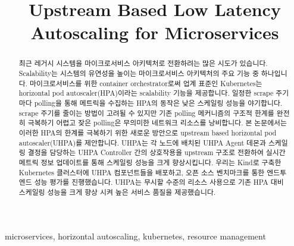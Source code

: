 \documentclass[conference]{IEEEtran}
\begin{document}
\title{Upstream Based Low Latency Autoscaling for Microservices\\}

\author{
}

\maketitle



\begin{abstract}
    최근 레거시 시스템을 마이크로서비스 아키텍처로 전환하려는 많은 시도가 있습니다. Scalability는 시스템의 유연성을 높이는 마이크로서비스 아키텍처의 주요 기능 중 하나입니다. 마이크로서비스를 위한 container orchestrator로써 업계 표준인 Kubernetes는 horizontal pod autoscaler(HPA)이라는 scalability 기능을 제공합니다. 일정한 scrape 주기마다 polling을 통해 메트릭을 수집하는 HPA의 동작은 낮은 스케일링 성능을 야기합니다. scrape 주기를 줄이는 방법이 고려될 수 있지만 기존 polling 메커니즘의 구조적 한계를 완전히 극복하기 어렵고 잦은 polling은 무의미한 네트워크 리소스를 낭비합니다. 본 논문에서는 이러한 HPA의 한계를 극복하기 위한 새로운 방안으로 upstream based horizontal pod autoscaler(UHPA)를 제안합니다. UHPA는 각 노드에 배치된 UHPA Agent 데몬과 스케일링 결정을 담당하는 UHPA Controller 간의 상호작용을 upstream 구조로 전환하여 실시간 메트릭 정보 업데이트를 통해 스케일링 성능을 크게 향상시킵니다. 우리는 Kind로 구축한 Kubernetes 클러스터에 UHPA 컴포넌트들을 배포하고, 오픈 소스 벤치마크를 통한 엔드투엔드 성능 평가를 진행했습니다. UHPA는 무시할 수준의 리소스 사용으로 기존 HPA 대비 스케일링 성능을 크게 향상 시켜 높은 서비스 품질을 제공했습니다.

\end{abstract}


\begin{IEEEkeywords}
    microservices, horizontal autoscaling, kubernetes, resource management
\end{IEEEkeywords}
\end{document}
